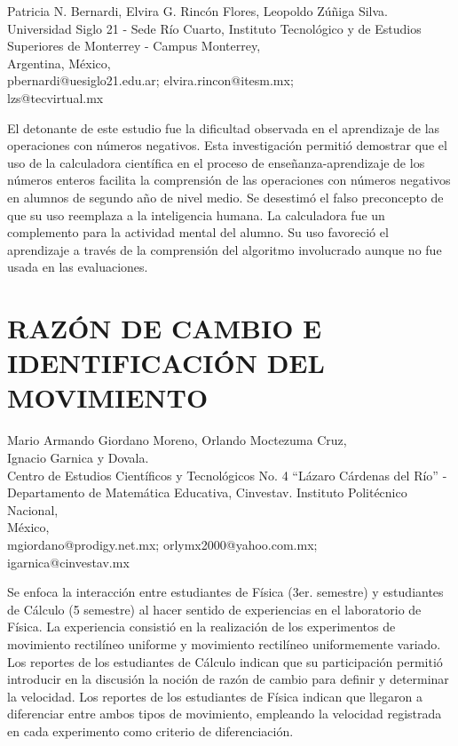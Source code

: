 \begin{datos}
Patricia N. Bernardi, Elvira G. Rincón Flores, Leopoldo Zúñiga Silva.\\
Universidad Siglo 21 - Sede Río Cuarto, Instituto Tecnológico y de Estudios Superiores de Monterrey - Campus Monterrey,\\
\hfill Argentina, México, \\
\hfill pbernardi@uesiglo21.edu.ar; elvira.rincon@itesm.mx; \\\hfill lzs@tecvirtual.mx
\end{datos}

El detonante de este estudio fue la dificultad observada en el aprendizaje
de las operaciones con números negativos. Esta investigación permitió
demostrar que el uso de la calculadora científica en el proceso de
enseñanza-aprendizaje de los números enteros facilita la comprensión
de las operaciones con números negativos en alumnos de segundo año
de nivel medio. Se desestimó el falso preconcepto de que su uso reemplaza
a la inteligencia humana. La calculadora fue un complemento para la
actividad mental del alumno. Su uso favoreció el aprendizaje a través
de la comprensión del algoritmo involucrado aunque no fue usada en
las evaluaciones. 


\section{RAZÓN DE CAMBIO E IDENTIFICACIÓN DEL MOVIMIENTO }

\begin{datos}
Mario Armando Giordano Moreno, Orlando Moctezuma Cruz,\\ Ignacio Garnica y Dovala.\\
Centro de Estudios Científicos y Tecnológicos No. 4 “Lázaro Cárdenas del Río” - Departamento de Matemática Educativa, Cinvestav. Instituto Politécnico Nacional,\\
\hfill  México, \\
\hfill mgiordano@prodigy.net.mx; orlymx2000@yahoo.com.mx;\\\hfill igarnica@cinvestav.mx 
\end{datos}

Se enfoca la interacción entre estudiantes de Física (3er. semestre)
y estudiantes de Cálculo (5\textdegree{} semestre) al hacer sentido
de experiencias en el laboratorio de Física. La experiencia consistió
en la realización de los experimentos de movimiento rectilíneo uniforme
y movimiento rectilíneo uniformemente variado. Los reportes de los
estudiantes de Cálculo indican que su participación permitió introducir
en la discusión la noción de razón de cambio para definir y determinar
la velocidad. Los reportes de los estudiantes de Física indican que
llegaron a diferenciar entre ambos tipos de movimiento, empleando
la velocidad registrada en cada experimento como criterio de diferenciación.


